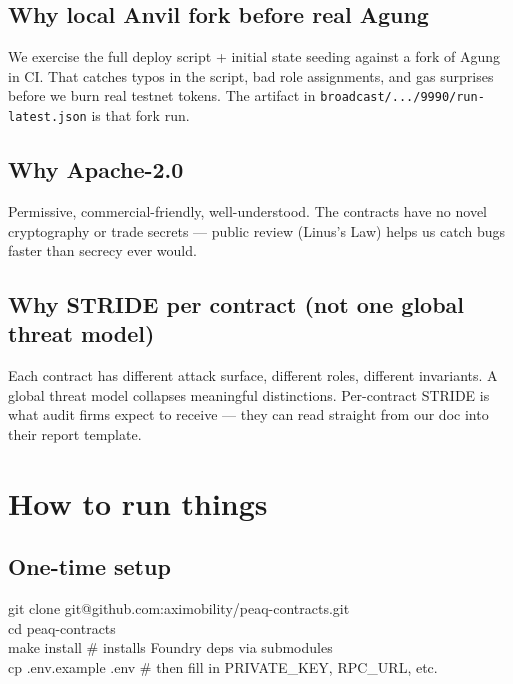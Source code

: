\documentclass[11pt,a4paper]{article}
\begin{document}
\subsection{Why local Anvil fork before real Agung}

We exercise the full deploy script + initial state seeding against a fork of Agung in CI. That catches typos in the script, bad role assignments, and gas surprises before we burn real testnet tokens. The artifact in \texttt{broadcast/.../9990/run-latest.json} is that fork run.

\subsection{Why Apache-2.0}

Permissive, commercial-friendly, well-understood. The contracts have no novel cryptography or trade secrets --- public review (Linus's Law) helps us catch bugs faster than secrecy ever would.

\subsection{Why STRIDE per contract (not one global threat model)}

Each contract has different attack surface, different roles, different invariants. A global threat model collapses meaningful distinctions. Per-contract STRIDE is what audit firms expect to receive --- they can read straight from our doc into their report template.

\newpage
\section{How to run things}

\subsection{One-time setup}

\begin{codebox}
git clone git@github.com:aximobility/peaq-contracts.git\\
cd peaq-contracts\\
make install            \# installs Foundry deps via submodules\\
cp .env.example .env    \# then fill in PRIVATE\_KEY, RPC\_URL, etc.
\end{codebox}
\end{document}
